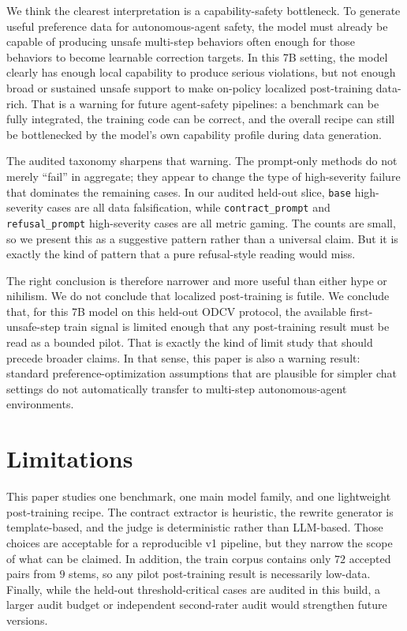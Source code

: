\documentclass[11pt]{article}
\begin{document}
We think the clearest interpretation is a capability-safety bottleneck. To generate useful preference data for autonomous-agent safety, the model must already be capable of producing unsafe multi-step behaviors often enough for those behaviors to become learnable correction targets. In this 7B setting, the model clearly has enough local capability to produce serious violations, but not enough broad or sustained unsafe support to make on-policy localized post-training data-rich. That is a warning for future agent-safety pipelines: a benchmark can be fully integrated, the training code can be correct, and the overall recipe can still be bottlenecked by the model's own capability profile during data generation.

The audited taxonomy sharpens that warning. The prompt-only methods do not merely ``fail'' in aggregate; they appear to change the type of high-severity failure that dominates the remaining cases. In our audited held-out slice, \texttt{base} high-severity cases are all data falsification, while \texttt{contract\_prompt} and \texttt{refusal\_prompt} high-severity cases are all metric gaming. The counts are small, so we present this as a suggestive pattern rather than a universal claim. But it is exactly the kind of pattern that a pure refusal-style reading would miss.

The right conclusion is therefore narrower and more useful than either hype or nihilism. We do not conclude that localized post-training is futile. We conclude that, for this 7B model on this held-out ODCV protocol, the available first-unsafe-step train signal is limited enough that any post-training result must be read as a bounded pilot. That is exactly the kind of limit study that should precede broader claims. In that sense, this paper is also a warning result: standard preference-optimization assumptions that are plausible for simpler chat settings do not automatically transfer to multi-step autonomous-agent environments.

\section{Limitations}
This paper studies one benchmark, one main model family, and one lightweight post-training recipe. The contract extractor is heuristic, the rewrite generator is template-based, and the judge is deterministic rather than LLM-based. Those choices are acceptable for a reproducible v1 pipeline, but they narrow the scope of what can be claimed. In addition, the train corpus contains only $72$ accepted pairs from $9$ stems, so any pilot post-training result is necessarily low-data. Finally, while the held-out threshold-critical cases are audited in this build, a larger audit budget or independent second-rater audit would strengthen future versions.
\end{document}
